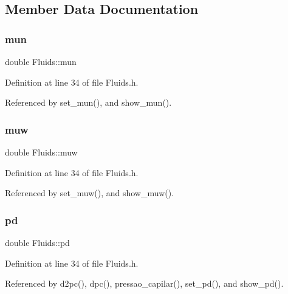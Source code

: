 \subsection{Member Data Documentation}
\mbox{\label{classFluids_a72205d7f9a6550265327b181b00db124}} 
\subsubsection{\texorpdfstring{mun}{mun}}
{\footnotesize\ttfamily double Fluids\+::mun\hspace{0.3cm}{\ttfamily [private]}}



Definition at line 34 of file Fluids.\+h.



Referenced by set\+\_\+mun(), and show\+\_\+mun().

\mbox{\label{classFluids_acde1b9068adb4e1cceed3a273161059d}} 
\subsubsection{\texorpdfstring{muw}{muw}}
{\footnotesize\ttfamily double Fluids\+::muw\hspace{0.3cm}{\ttfamily [private]}}



Definition at line 34 of file Fluids.\+h.



Referenced by set\+\_\+muw(), and show\+\_\+muw().

\mbox{\label{classFluids_a4a6a5567a51aeb163014715a961f58d8}} 
\subsubsection{\texorpdfstring{pd}{pd}}
{\footnotesize\ttfamily double Fluids\+::pd\hspace{0.3cm}{\ttfamily [private]}}



Definition at line 34 of file Fluids.\+h.



Referenced by d2pc(), dpc(), pressao\+\_\+capilar(), set\+\_\+pd(), and show\+\_\+pd().

